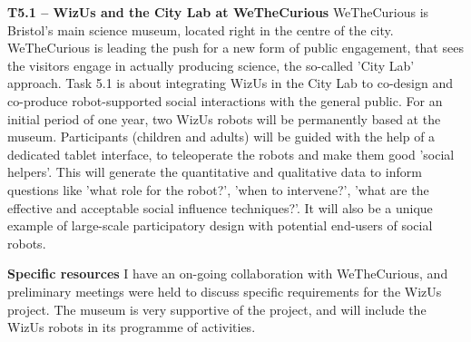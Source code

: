 \documentclass[11pt]{report}
\newcommand{\project}{WizUs\xspace}
\begin{document}
\textbf{T5.1 -- \project and the City Lab at WeTheCurious}
WeTheCurious is Bristol's main science museum, located right in the centre of
the city. WeTheCurious is leading the push for a new form of public engagement,
that sees the visitors engage in actually producing science, the so-called 'City
Lab' approach. Task 5.1 is about integrating \project in the City Lab to
co-design and co-produce robot-supported social interactions with the general
public. For an initial period of one year, two \project robots will be permanently
based at the museum. Participants (children and adults) will be guided
with the help of a dedicated tablet interface, to teleoperate the robots and
make them good 'social helpers'. This will generate the quantitative and
qualitative data to inform questions like 'what role for the robot?', 'when to
intervene?', 'what are the effective and acceptable social influence
techniques?'. It will also be a unique example of large-scale participatory
design with potential end-users of social robots.

\textbf{Specific resources} I have an on-going collaboration with WeTheCurious,
and preliminary meetings were held to discuss specific requirements for the
\project project. The museum is very supportive of the project, and will include
the \project robots in its programme of activities.

% 
% 
% 
% 
% 
% 
% 
% 
% 
\end{document}
